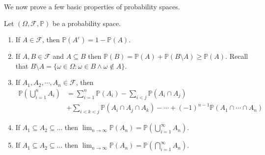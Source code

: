 \documentclass[notitlepage,abstract=on,twoside=semi]{scrartcl}
\newcommand{\om}{\ensuremath{\Omega}}
\newcommand{\F}{\ensuremath{\mathcal{F}}}
\newcommand{\Prob}{\ensuremath{\mathbb{P}}}
\begin{document}
We now prove a few basic properties of probability spaces.
\begin{proposition}
  \label{2:5}
  Let $(\om, \F, \Prob)$ be a probability space.
  \begin{enumerate}
  \item If $A \in \F$, then $\Prob(A^{c}) = 1 - \Prob(A)$.
  \item If $A, B \in \F$ and $A \subseteq B$ then $\Prob(B) = \Prob(A) + \Prob
    (B \setminus A) \geq \Prob(A)$. Recall that $B \setminus A = \{\omega \in
    \om : \omega \in B \land \omega \not\in A\}$.
  \item If $A_{1}, A_{2}, \cdots, A_{n} \in \F$, then
    \[
      \begin{split}
      \Prob(\bigcup_{i=1}^{n}A_{i}) &= \sum_{i=1}^{n}\Prob(A_{i}) - \sum_{i < j}
                                      \Prob(A_{i} \cap A_{j}) \\
                                    &+ \sum_{i < k < j} \Prob(A_{i} \cap A_{j} \cap
        A_{k}) - \cdots + (-1)^{n-1}\Prob(A_{1} \cap \cdots \cap A_{n})
        \end{split}
      \]
      
    \item If $A_{1} \subseteq A_{2} \subseteq \hdots$ then
      $\lim_{n \to \infty} \Prob(A_{n}) = \Prob(\bigcup_{i=1}^{\infty} A_{n})$.
    \item If $A_{1} \subseteq A_{2} \subseteq \hdots$ then $\lim_{n \to \infty}
      \Prob(A_{n}) = \Prob(\bigcap_{i=1}^{\infty} A_{n})$.
  \end{enumerate}
\end{proposition}
\end{document}
